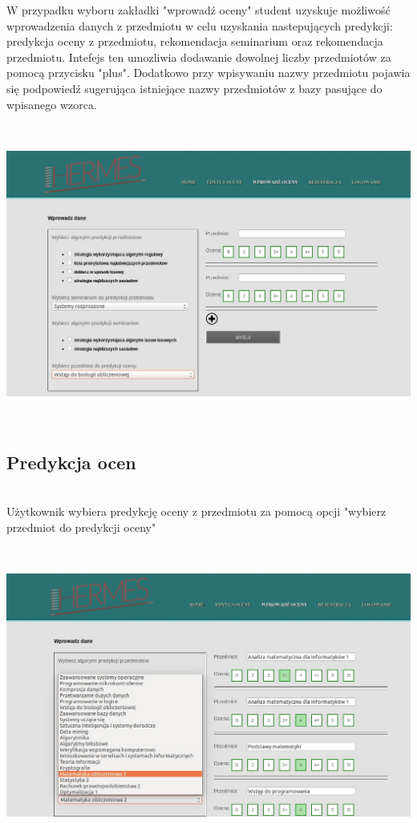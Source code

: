 \documentclass[licencjacka]{pracamgr}
\begin{document}
W przypadku wyboru zakładki "wprowadź oceny" student uzyskuje możliwość wprowadzenia danych z przedmiotu w celu uzyskania nastepujących predykcji: predykcja oceny z przedmiotu, rekomendacja seminarium oraz rekomendacja przedmiotu. Intefejs ten umozliwia dodawanie dowolnej liczby przedmiotów za pomocą przycisku "plus". Dodatkowo przy wpisywaniu nazwy przedmiotu pojawia się podpowiedź sugerująca istniejące nazwy przedmiotów z bazy pasujące do wpisanego wzorca.   \par
~\\
\begin{minipage}{\linewidth}
	\centering
           \includegraphics[scale=0.5]{interfejsWstepny.jpg}
\end{minipage} \\ 



\subsection{Predykcja ocen}
~\\ \indent
Użytkownik wybiera predykcję oceny z przedmiotu za pomocą opcji "wybierz przedmiot do predykcji oceny" \par
~\\
\begin{minipage}{\linewidth}
	\centering
           \includegraphics[scale=0.5]{predykcjaPrzedm.jpg}
\end{minipage} \\ \\
\end{document}
